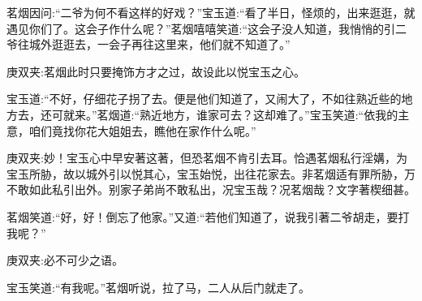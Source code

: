 \begin{parag}
    茗烟因问:“二爷为何不看这样的好戏？”宝玉道:“看了半日，怪烦的，出来逛逛，就遇见你们了。这会子作什么呢？”茗烟嘻嘻笑道:“这会子没人知道，我悄悄的引二爷往城外逛逛去，一会子再往这里来，他们就不知道了。”\begin{note}庚双夹:茗烟此时只要掩饰方才之过，故设此以悦宝玉之心。\end{note}宝玉道:“不好，仔细花子拐了去。便是他们知道了，又闹大了，不如往熟近些的地方去，还可就来。”茗烟道:“熟近地方，谁家可去？这却难了。”宝玉笑道:“依我的主意，咱们竟找你花大姐姐去，瞧他在家作什么呢。”\begin{note}庚双夹:妙！宝玉心中早安著这著，但恐茗烟不肯引去耳。恰遇茗烟私行淫媾，为宝玉所胁，故以城外引以悦其心，宝玉始悦，出往花家去。非茗烟适有罪所胁，万不敢如此私引出外。别家子弟尚不敢私出，况宝玉哉？况茗烟哉？文字著楔细甚。\end{note}茗烟笑道:“好，好！倒忘了他家。”又道:“若他们知道了，说我引著二爷胡走，要打我呢？”\begin{note}庚双夹:必不可少之语。\end{note}宝玉笑道:“有我呢。”茗烟听说，拉了马，二人从后门就走了。
\end{parag}


